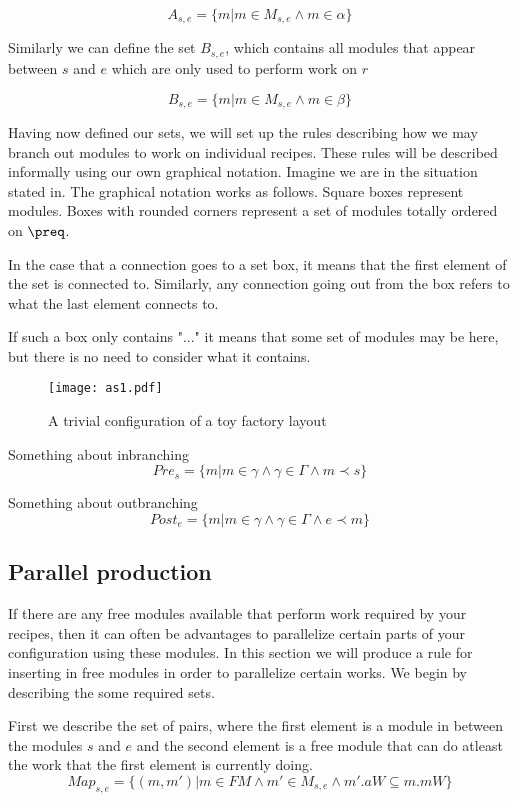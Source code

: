\[A_{s,e} = \{m |m \in M_{s,e} \land m \in \alpha\}\]

Similarly we can define the set $B_{s,e}$, which contains all modules that appear between $s$ and $e$ which are only used to perform work on $r$

\[B_{s,e} = \{m |m \in M_{s,e} \land m \in \beta\}\]

Having now defined our sets, we will set up the rules describing how we may branch out modules to work on individual recipes. These rules will be described informally using our own graphical notation. Imagine we are in the situation stated in. The graphical notation works as follows. Square boxes represent modules. Boxes with rounded corners represent a set of modules totally ordered on $\preq$. 


In the case that a connection goes to a set box, it means that the first element of the set is connected to. Similarly, any connection going out from the box refers to what the last element connects to. 

 If such a box only contains "..." it means that some set of modules may be here, but there is no need to consider  what it contains. 



\begin{figure}[h]
\centering
\texttt{[image: as1.pdf]}
\caption{A trivial configuration of a toy factory layout}
\label{fig:asbase}
\end{figure}


Something about inbranching
\[Pre_{s} = \{m | m \in \gamma \land \gamma \in \Gamma \land m \prec s\}\]

Something about outbranching
\[Post_{e} = \{m | m \in \gamma \land \gamma \in \Gamma \land e \prec  m \}\]



\subsection{Parallel production}
If there are any free modules available that perform work required by your recipes, then it can often be advantages to parallelize certain parts of your configuration using these modules. In this section we will produce a rule for inserting in free modules in order to parallelize certain works. We begin by describing the some required sets.

First we describe the set of pairs, where the first element is a module in between the modules $s$ and $e$ and the second element is a free module that can do atleast the work that the first element is currently doing.
\[Map_{s, e} = \{(m, m')| m \in FM \land m' \in M_{s,e} \land m'.aW \subseteq m.mW\} \]


